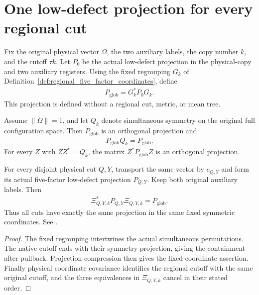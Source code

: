 \section{One low-defect projection for every regional cut}
\label{sec:regional_low_defect_projection}

\begin{definition}
\label{def:global_replica_low_defect_projection}
\leanok
Fix the original physical vector $\Omega$, the two auxiliary labels,
the copy number $k$, and the cutoff $\tau k$. Let $P_0$ be the actual
low-defect projection in the physical-copy and two auxiliary registers.
Using the fixed regrouping $G_k$ of
Definition~\ref{def:regional_five_factor_coordinates}, define
\begin{align}
 P_{\mathrm{glob}}=G_k^*P_0G_k.
\end{align}
This projection is defined without a regional cut, metric, or mean tree.
\end{definition}

\begin{theorem}
\label{thm:regional_low_defect_projection_global}
\leanok
Assume $\|\Omega\|=1$, and let $Q_k$ denote simultaneous symmetry on
the original full configuration space. Then $P_{\mathrm{glob}}$ is an
orthogonal projection and
\begin{align}
 P_{\mathrm{glob}}Q_k=P_{\mathrm{glob}}.
\end{align}
For every $Z$ with $ZZ^*=Q_k$, the matrix
$Z^*P_{\mathrm{glob}}Z$ is an orthogonal projection.

For every disjoint physical cut $Q,Y$, transport the same vector by
$e_{Q,Y}$ and form its actual five-factor low-defect projection
$P_{Q,Y}$. Keep both original auxiliary labels. Then
\begin{align}
 \Xi_{Q,Y,k}^*P_{Q,Y}\Xi_{Q,Y,k}=P_{\mathrm{glob}}.
\end{align}
Thus all cuts have exactly the same projection in the same fixed
symmetric coordinates. See
\cite[Section~8, lines~20--37, 421--456 and~603--615]{OpenAI2026AreaLaw}.
\end{theorem}
\begin{proof}
\leanok
{}
The fixed regrouping intertwines the actual simultaneous permutations.
The native cutoff ends with their symmetry projection, giving the
containment after pullback. Projection compression then gives the
fixed-coordinate assertion. Finally physical coordinate covariance
identifies the regional cutoff with the same original cutoff, and the
three equivalences in $\Xi_{Q,Y,k}$ cancel in their stated order.
\end{proof}
